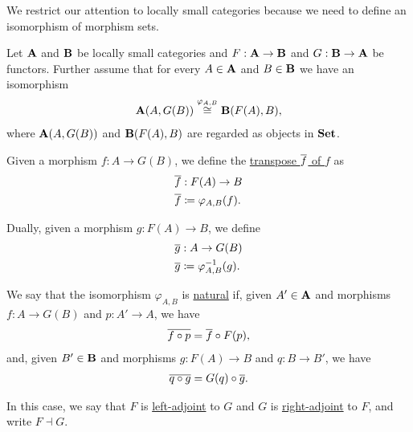 \begin{note}
  We restrict our attention to locally small categories because we need to define an isomorphism of morphism sets.
\end{note}
\begin{definition}\label{def:adjoint_functor}\cite[definition 2.1.1]{Leinster2014}
  Let $\operatorname{\mathbf{A}}$ and $\operatorname{\mathbf{B}}$ be locally small categories and $F: \operatorname{\mathbf{A}} \to \operatorname{\mathbf{B}}$ and $G: \operatorname{\mathbf{B}} \to \operatorname{\mathbf{A}}$ be functors. Further assume that for every $A \in \operatorname{\mathbf{A}}$ and $B \in \operatorname{\mathbf{B}}$ we have an isomorphism
  \begin{align*}
    \operatorname{\mathbf{A}}(A, G(B)) \overset {\varphi_{A, B}} {\cong} \operatorname{\mathbf{B}}(F(A), B),
  \end{align*}
  where $\operatorname{\mathbf{A}}(A, G(B))$ and $\operatorname{\mathbf{B}}(F(A), B)$ are regarded as objects in $\operatorname{\mathbf{Set}}$.

  Given a morphism $f: A \to G(B)$, we define the \uline{transpose $\overline{f}$ of $f$} as
  \begin{align*}
    &\overline{f}: F(A) \to B \\
    &\overline{f} \coloneqq \varphi_{A, B} (f).
  \end{align*}

  Dually, given a morphism $g: F(A) \to B$, we define
  \begin{align*}
    &\overline{g}: A \to G(B) \\
    &\overline{g} \coloneqq \varphi_{A, B}^{-1} (g).
  \end{align*}

  We say that the isomorphism $\varphi_{A, B}$ is \uline{natural} if,  given $A' \in \operatorname{\mathbf{A}}$ and morphisms $f: A \to G(B)$ and $p: A' \to A$, we have
  \begin{align*}
    \overline{f \circ p} = \overline{f} \circ F(p),
  \end{align*}
  and, given $B' \in \operatorname{\mathbf{B}}$ and morphisms $g: F(A) \to B$ and $q: B \to B'$, we have
  \begin{align*}
    \overline{q \circ g} = G(q) \circ \overline{g}.
  \end{align*}

  In this case, we say that $F$ is \uline{left-adjoint} to $G$ and $G$ is \uline{right-adjoint} to $F$, and write $F \dashv G$.
\end{definition}


